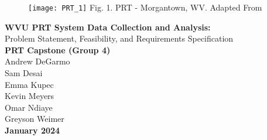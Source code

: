 \begin{titlepage}
    \begin{center}
        \begin{figure}[t]
            \texttt{[image: PRT\_1]}
            Fig. 1. PRT - Morgantown, WV. Adapted From \cite{M_2018}
        \end{figure}
        \fontsize{24}{28}\selectfont
        \textbf{WVU PRT System Data Collection and Analysis:}\\
        Problem Statement, Feasibility, and Requirements Specification\\
        \vspace{0.25cm}
        \vspace*{\fill}
        \fontsize{10}{11}\selectfont
        \textbf{PRT Capstone (Group 4)}\\
        Andrew DeGarmo\\
        Sam Desai\\
        Emma Kupec\\
        Kevin Meyers\\
        Omar Ndiaye\\
        Greyson Weimer\\
        \vspace*{\fill}
        \textbf{January 2024}\\
    \end{center}
\end{titlepage}